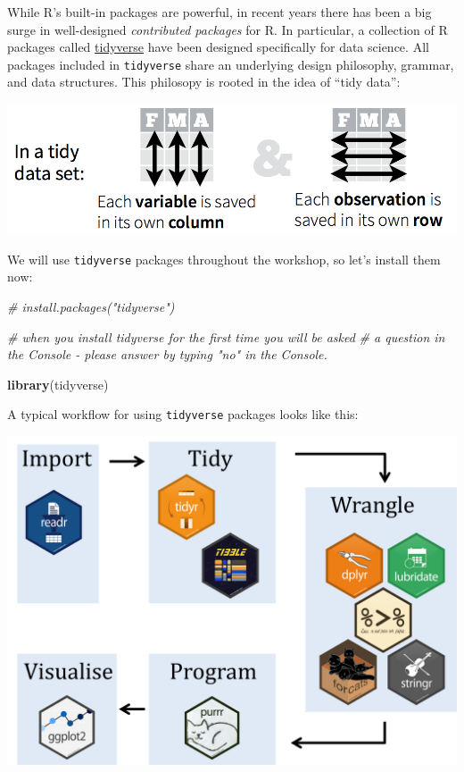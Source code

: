\documentclass[]{book}
\newenvironment{Shaded}{\begin{snugshade}}{\end{snugshade}}
\newcommand{\CommentTok}[1]{\textcolor[rgb]{0.56,0.35,0.01}{\textit{#1}}}
\newcommand{\KeywordTok}[1]{\textcolor[rgb]{0.13,0.29,0.53}{\textbf{#1}}}
\newcommand{\NormalTok}[1]{#1}
\begin{document}
While R's built-in packages are powerful, in recent years there has
been a big surge in well-designed \emph{contributed packages} for R.
In particular, a collection of R packages called
\href{https://www.tidyverse.org/}{tidyverse} have been
designed specifically for data science. All packages included in
\texttt{tidyverse} share an underlying design philosophy, grammar, and
data structures. This philosopy is rooted in the idea of ``tidy data'':

\includegraphics{R/Rintro/images/tidy_data.png}

We will use \texttt{tidyverse} packages throughout the
workshop, so let's install them now:

\begin{Shaded}
\begin{Highlighting}[]
\CommentTok{# install.packages("tidyverse")}

\CommentTok{# when you install tidyverse for the first time you will be asked}
\CommentTok{# a question in the Console - please answer by typing "no" in the Console.}

\KeywordTok{library}\NormalTok{(tidyverse)}
\end{Highlighting}
\end{Shaded}

A typical workflow for using \texttt{tidyverse} packages looks like this:

\includegraphics{R/Rintro/images/tidy_workflow.png}
\end{document}
